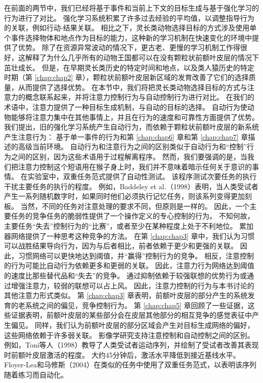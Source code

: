在前面的两节中，我们已经将基于事件和当前上下文的目标生成与基于强化学习的行为进行了对比。
强化学习系统积累了许多过去经验的平均值，以调整指导行为的关联，例如行动-结果关联。
相比之下，灵长类动物选择目标的方式涉及使用单个事件选择物体和地点作为目标的能力，这种新的学习机制在快速变化的环境中提供了优势。
除了在资源异常波动的情况下，更古老、更慢的学习机制工作得很好，这解释了为什么几乎所有的动物王国都可以在没有颗粒状前额叶皮层的情况下茁壮成长。
但是，在早期灵长类历史的特定时间和地点，以及类人猿历史的特定时期（第 \ref{chap:chap2} 章），颗粒状前额叶皮层新区域的发育改善了它们的选择质量，从而提供了选择优势。
在本节中，我们将把灵长类动物选择目标的方式与注意力的概念联系起来，并将注意力控制行为与自动控制行为进行对比。
在我们的术语中，注意力提供了一种目标生成机制，与自动的目标的选择。
自动行为使动物能够将注意力集中在其他事情上，并且在行为的速度和可靠性方面提供了优势。
我们提出，旧的强化学习系统产生自动行为，而依赖于颗粒状前额叶皮层的新系统产生注意行为：
基于单一事件的行为和第 \ref{chap:chap6} 章和第 \ref{chap:chap7} 章描述的高级当前环境。
自动行为和注意行为之间的区别类似于自动行为和“控制”行为之间的区别，因为这些术语用于过程解离程序。
然而，我们要强调的是，当我们把注意力控制这个短语用在猴子身上时，我们并不意味着暗示任何关于意识的事情。
在实验室中，双重任务范式提供了自动性测试。
该程序测试次要任务的执行干扰主要任务的执行的程度。
例如，Baddeley et al.（1998）表明，当人类受试者产生一系列随机数字时，如果同时他们必须执行记忆任务，则该系列变得更加刻板。
当然，不同的任务对注意处理的要求不同，但原则是一样的。
因此，一个主要任务的竞争任务的脆弱性提供了一个操作定义的专心控制的行为。
不知何故，主要任务“失去”控制行为的“比赛”，或者至少在某种程度上处于不利地位。
累加器网络提供了一种思考这种竞争的方法。
在第 \ref{chap:chap3} 章中，我们认为习惯可以战胜结果导向行为，因为与后者相比，前者依赖于更少和更强的关联。
因此，习惯网络可以更快地达到阈值，并“赢得”控制行为的竞争。
相反，注意控制的行为可能比自动行为依赖更多和更弱的关联。
因此，注意力行为网络达到阈值的速度比那些替代品和“失去”的竞争。
通过抑制依赖于较强联想的优势行为或通过增强注意力，较弱的联想可以占上风。
因此，注意力控制的行为与本书讨论的其他注意力形式类似。
第 \ref{chap:chap3} 章表明，前额叶皮层的部分产生的系统发育的老系统之间的偏见，竞争控制行为。
第 \ref{chap:chap5} 章回顾了一些证据，这些证据表明，前额叶皮层的某些部分会在皮层其他部分的相互竞争的感觉表征中产生偏见。
同样，我们认为前额叶皮层的部分区域会产生对目标生成网络的偏好，这些网络依赖于许多弱关联。
影像学研究支持注意控制和自动控制之间的区别。
例如，Toni等人（1998）教导了人类受试者运动序列，并绘制了受试者改善其表现时前额叶皮层激活的程度。
大约45分钟后，激活水平降低到接近基线水平。Floyer-Lea和马修斯（2004）在类似的任务中使用了双重任务范式，以表明该序列随着练习而自动化。
